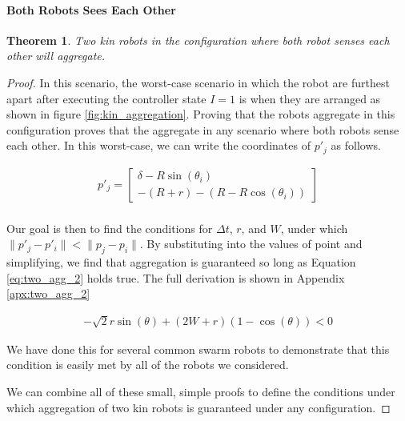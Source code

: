 \documentclass[conference]{IEEEtran}
\newtheorem{theorem}{Theorem}
\begin{document}
    \paragraph{Both Robots Sees Each Other}
    \begin{theorem} \label{thm:both robots see each_other}
      Two kin robots in the configuration where both robot senses each other will aggregate.
    \end{theorem}
    \begin{proof}
      In this scenario, the worst-case scenario in which the robot are furthest apart after executing the controller state $I=1$ is when they are arranged as shown in figure \ref{fig:kin_aggregation}. Proving that the robots aggregate in this configuration proves that the aggregate in any scenario where both robots sense each other. In this worst-case, we can write the coordinates of $p'_j$ as follows.

    \begin{equation} \label{eq:two_kin_vars_1}
      \begin{split}
        p'_j = \begin{bmatrix}\delta - R\sin(\theta_i) \\ -(R+r) - (R-R\cos(\theta_i))\end{bmatrix} \\
      \end{split}
    \end{equation}

      Our goal is then to find the conditions for $\Delta t$, $r$, and $W$, under which $\lVert p'_j - p'_i \rVert < \lVert p_j - p_i \rVert$. By substituting into the values of point and simplifying, we find that aggregation is guaranteed so long as Equation \eqref{eq:two_agg_2} holds true. The full derivation is shown in Appendix \ref{apx:two_agg_2}

      \begin{equation} \label{eq:two_agg_2}
        \begin{split}
          -\sqrt{2}r\sin(\theta) + (2W+r)(1 - \cos(\theta)) < 0
        \end{split}
      \end{equation}

      We have done this for several common swarm robots to demonstrate that this condition is easily met by all of the robots we considered. %

      We can combine all of these small, simple proofs to define the conditions under which aggregation of two kin robots is guaranteed under any configuration.

    \end{proof}
\end{document}
